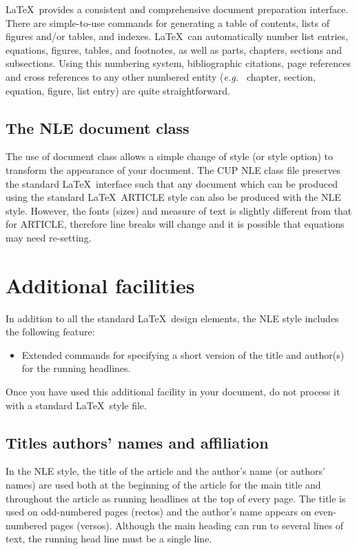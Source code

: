 \documentclass{nle}
\begin{document}
\LaTeX\ provides a consistent and comprehensive document preparation
interface. There are simple-to-use commands for generating a table of
contents, lists of figures and/or tables, and indexes. \LaTeX\ can
automatically number list entries, equations, figures, tables, and
footnotes, as well as parts, chapters, sections and subsections.
Using this numbering system, bibliographic citations, page references
and cross references to any other numbered entity ({\it e.g.\ } chapter,
section, equation, figure, list entry) are quite straightforward.

\subsection{The NLE document class}

The use of document class allows a simple change of style (or style option)
to transform the appearance of your document. The CUP NLE class file preserves
the standard \LaTeX\ interface such that any document which can be produced
using the standard \LaTeX\ ARTICLE style can also be produced with the
NLE style. However, the fonts (sizes) and measure of text is slightly different
from that for ARTICLE, therefore line breaks will change and it is possible
that equations may need re-setting.

\section{Additional facilities}

In addition to all the standard \LaTeX\ design elements, the NLE style
includes the following feature:
\begin{itemize}
  \item Extended commands for specifying a short version
        of the title and author(s) for the running
        headlines.
\end{itemize}
Once you have used this additional facility in your document,
do not process it with a standard \LaTeX\ style file.

\subsection{Titles authors' names and affiliation}

In the NLE style, the title of the article and the author's name (or authors'
names) are used both at the beginning of the article for the main title and
throughout the article as running headlines at the top of every page.
The title is used on odd-numbered pages (rectos) and the author's name appears
on even-numbered pages (versos).
Although the main heading can run to several lines of text, the running head
line must be a single line.
\end{document}
